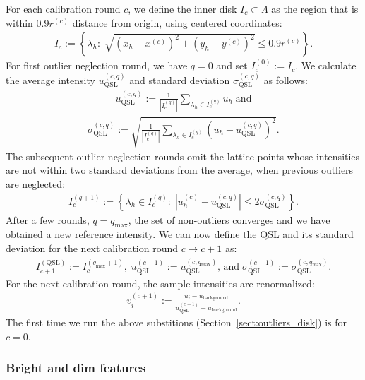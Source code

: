 \documentclass{aa}
\newcommand{\eqnl}[2]{\begin{eqnarray}\label{#1}#2\end{eqnarray}}
\newcommand{\s}[2]{{#1}_{\mathrm{#2}}}
\begin{document}
  For each calibration round $c$, we define the inner disk $I_c \subset \Lambda$ as the region that is within $0.9 r^{(c)}$ distance from origin, using centered coordinates:
  \eqnl{calib_inner_disk1}{
  I_c := \left\{ \lambda_h :\; \sqrt{\left( x_h - x^{(c)} \right)^2 + \left( y_h - y^{(c)} \right)^2} \le 0.9 r^{(c)} \right\} \text{.}
  }  
  For first outlier neglection round, we have $q=0$ and set $I_{c}^{(0)} := I_c$. We calculate the average intensity $\s{u}{QSL}^{(c,q)}$ and standard deviation $\s{\sigma}{QSL}^{(c,q)}$ as follows:
  \eqnl{calib_inner_disk2}{
  \s{u}{QSL}^{(c,q)} := \frac{1}{|I_{c}^{(q)}|} \sum \limits_{\lambda_h \in I_{c}^{(q)}} u_h \; \text{and}
  }
  \eqnl{calib_inner_disk3}{
  \s{\sigma}{QSL}^{(c,q)} := \sqrt{\frac{1}{|I_{c}^{(q)}|} \sum \limits_{\lambda_h \in I_{c}^{(q)}} \left( u_h - \s{u}{QSL}^{(c,q)} \right)^2} \text{.}
  }
  The subsequent outlier neglection rounds omit the lattice points whose intensities are not within two standard deviations from the average, when previous outliers are neglected:
  \eqnl{calib_inner_disk4}{
  I_c^{(q+1)} := \left\{ \lambda_h \in I_c^{(q)} :\; \left|u_h^{(c)} - \s{u}{QSL}^{(c,q)} \right| \le 2 \s{\sigma}{QSL}^{(c,q)} \right\} \text{.}
  }
  After a few rounds, $q = \s{q}{max}$, the set of non-outliers converges and we have obtained a new reference 
  intensity. We can now define the QSL and its standard deviation for the next calibration round $c \mapsto c+1$ as:
  \eqnl{calib_inner_disk5}{
  I_{c+1}^{(\mathrm{QSL})} := I_{c}^{(\s{q}{max}+1)},\; \s{u}{QSL}^{(c+1)} := \s{u}{QSL}^{(c,\s{q}{max})} \text{, and} \; \s{\sigma}{QSL}^{(c+1)} := \s{\sigma}{QSL}^{(c,\s{q}{max})} \text{.}
  }
  For the next calibration round, the sample intensities are renormalized:
  \eqnl{calib_inner_disk6}{
  v_i^{(c+1)} := \frac{u_i - \s{u}{background}}{\s{u}{QSL}^{(c+1)} - \s{u}{background}} \text{.}
  }
  The first time we run the above substitions (Section~\ref{sect:outliers_disk}) is for $c=0$.

  \subsubsection{Bright and dim features} \label{sect:bright_dim_features}
\end{document}
